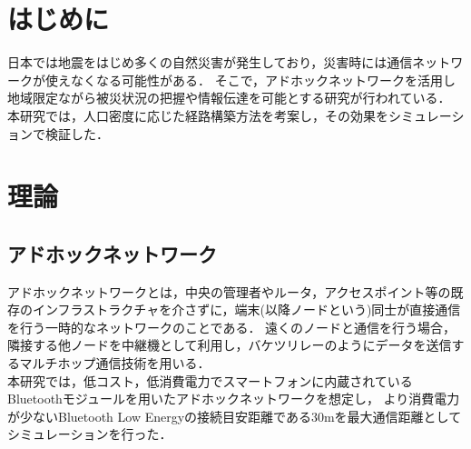 \documentclass[a4paper, 9pt]{ltjsarticle}
\begin{document}
\setlength{\columnsep}{7.5mm}

\twocolumn[
    \begin{center}
        {\vspace{-1em}}

        {\fontsize{15pt}{15pt}\selectfont{災害時を想定したアドホックネットワーク構築手法の検討}}

        {\vspace{1.5em}}

        {\fontsize{13pt}{13pt}\selectfont{Study of Construction Methods for Ad-Hoc Network under Disaster}}
    \end{center}



    \begin{flushright}
      {\fontsize{11pt}{11pt}\selectfont{T5-17　末廣隼人\\}}
      {\fontsize{11pt}{11pt}\selectfont{指導教員　髙﨑和之}}
    \end{flushright}

    \vspace{1em}

    \thispagestyle{empty}
]

\section{はじめに} \label{label:first}
日本では地震をはじめ多くの自然災害が発生しており，災害時には通信ネットワークが使えなくなる可能性がある．
そこで，アドホックネットワークを活用し地域限定ながら被災状況の把握や情報伝達を可能とする研究が行われている．
本研究では，人口密度に応じた経路構築方法を考案し，その効果をシミュレーションで検証した．%

\section{理論} \label{label:theory}
\subsection{アドホックネットワーク} \label{sublabel:about ad-hoc network}
アドホックネットワークとは，中央の管理者やルータ，アクセスポイント等の既存のインフラストラクチャを介さずに，端末(以降ノードという)同士が直接通信を行う一時的なネットワークのことである．
遠くのノードと通信を行う場合，隣接する他ノードを中継機として利用し，バケツリレーのようにデータを送信するマルチホップ通信技術を用いる．%
\\ \indent 本研究では，低コスト，低消費電力でスマートフォンに内蔵されているBluetoothモジュールを用いたアドホックネットワークを想定し，
より消費電力が少ないBluetooth Low Energyの接続目安距離である30mを最大通信距離としてシミュレーションを行った．
\end{document}
